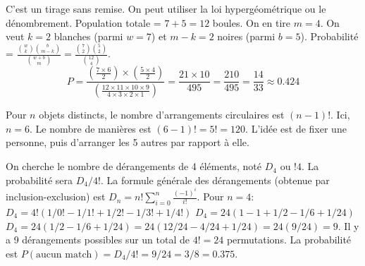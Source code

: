 \begin{correctionbox}
C'est un tirage sans remise. On peut utiliser la loi hypergéométrique ou le dénombrement.
Population totale = $7+5=12$ boules. On en tire $m=4$.
On veut $k=2$ blanches (parmi $w=7$) et $m-k=2$ noires (parmi $b=5$).
Probabilité = $\frac{\binom{w}{k} \binom{b}{m-k}}{\binom{w+b}{m}} = \frac{\binom{7}{2} \binom{5}{2}}{\binom{12}{4}}$.
$$ P = \frac{(\frac{7 \times 6}{2}) \times (\frac{5 \times 4}{2})}{(\frac{12 \times 11 \times 10 \times 9}{4 \times 3 \times 2 \times 1})} = \frac{21 \times 10}{495} = \frac{210}{495} = \frac{14}{33} \approx 0.424 $$
\end{correctionbox}

\begin{correctionbox}
Pour $n$ objets distincts, le nombre d'arrangements circulaires est $(n-1)!$.
Ici, $n=6$. Le nombre de manières est $(6-1)! = 5! = 120$.
L'idée est de fixer une personne, puis d'arranger les 5 autres par rapport à elle.
\end{correctionbox}

\begin{correctionbox}
On cherche le nombre de dérangements de 4 éléments, noté $D_4$ ou $!4$. La probabilité sera $D_4 / 4!$.
La formule générale des dérangements (obtenue par inclusion-exclusion) est $D_n = n! \sum_{i=0}^n \frac{(-1)^i}{i!}$.
Pour $n=4$:
$D_4 = 4! (1/0! - 1/1! + 1/2! - 1/3! + 1/4!)$
$D_4 = 24 (1 - 1 + 1/2 - 1/6 + 1/24)$
$D_4 = 24 (1/2 - 1/6 + 1/24) = 24 (12/24 - 4/24 + 1/24) = 24 (9/24) = 9$.
Il y a 9 dérangements possibles sur un total de $4! = 24$ permutations.
La probabilité est $P(\text{aucun match}) = D_4 / 4! = 9/24 = 3/8 = 0.375$.
\end{correctionbox}